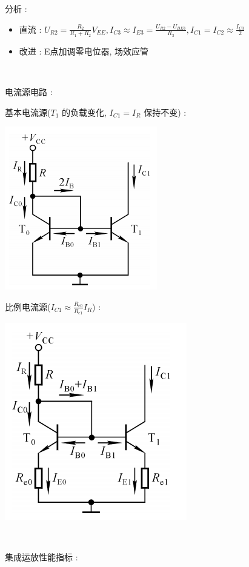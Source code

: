 \documentclass[UTF8, 12pt]{ctexart}
\begin{document}
	分析 :
	\begin{itemize}[leftmargin = 4em]
		\item 直流 : $ U_{R2} = \frac{R_{2}}{R_{1}+R_{2}}V_{EE}, I_{C3} \approx I_{E3} = \frac{U_{R2}-U_{BE3}}{R_{3}}, I_{C1} = I_{C2} \approx \frac{I_{C3}}{2} $
		\item 改进 : E点加调零电位器, 场效应管
	\end{itemize}

	~

	\noindent
	电流源电路 :

	基本电流源($ T_{1} $ 的负载变化, $ I_{C1} = I_{R} $ 保持不变) :

	\includegraphics[scale = 0.4]{03/基本电流源电路图.png}

	比例电流源($ I_{C1} \approx \frac{R_{e0}}{R_{e1}}I_{R} $) :

	\includegraphics[scale = 0.4]{03/比例电流源电路图.png}

	~

	\noindent
	集成运放性能指标 :
\end{document}
